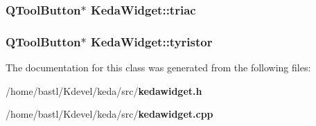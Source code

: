 \subsubsection{\setlength{\rightskip}{0pt plus 5cm}QTool\-Button$\ast$ {\bf Keda\-Widget::triac}}\label{classKedaWidget_f44f9787dfed918901c6e1847f94dea4}


\subsubsection{\setlength{\rightskip}{0pt plus 5cm}QTool\-Button$\ast$ {\bf Keda\-Widget::tyristor}}\label{classKedaWidget_08b4291dfeb4cc1168b02fe54f4525b2}




The documentation for this class was generated from the following files:\begin{CompactItemize}
\item 
/home/bastl/Kdevel/keda/src/{\bf kedawidget.h}\item 
/home/bastl/Kdevel/keda/src/{\bf kedawidget.cpp}\end{CompactItemize}
